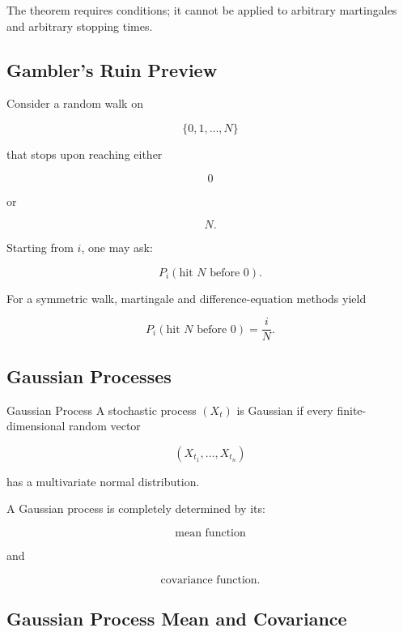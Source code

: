 The theorem requires conditions; it cannot be applied to arbitrary
martingales and arbitrary stopping times.

\subsection{Gambler's Ruin Preview}
\label{subsec:gamblers-ruin-preview}

Consider a random walk on

\[
\{0,1,\ldots,N\}
\]

that stops upon reaching either

\[
0
\]

or

\[
N.
\]

Starting from \(i\), one may ask:

\[
\boxed{
P_i(\text{hit }N\text{ before }0).
}
\]

For a symmetric walk, martingale and difference-equation methods yield

\[
\boxed{
P_i(\text{hit }N\text{ before }0)
=
\frac{i}{N}.
}
\]

\subsection{Gaussian Processes}
\label{subsec:gaussian-processes}

\begin{definitionbox}{Gaussian Process}
A stochastic process \((X_t)\) is Gaussian if every finite-dimensional
random vector

\[
\boxed{
(X_{t_1},\ldots,X_{t_n})
}
\]

has a multivariate normal distribution.
\end{definitionbox}

A Gaussian process is completely determined by its:

\[
\boxed{
\text{mean function}
}
\]

and

\[
\boxed{
\text{covariance function}.
}
\]

\subsection{Gaussian Process Mean and Covariance}
\label{subsec:gaussian-process-mean-covariance}

